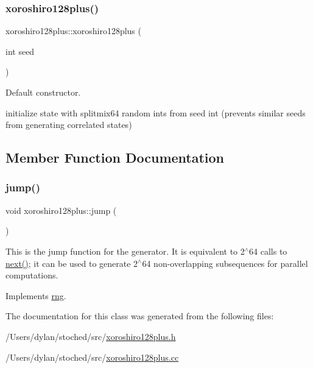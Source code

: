 \subsubsection{\texorpdfstring{xoroshiro128plus()}{xoroshiro128plus()}}
{\footnotesize\ttfamily xoroshiro128plus\+::xoroshiro128plus (\begin{DoxyParamCaption}\item[{int}]{seed }\end{DoxyParamCaption})}



Default constructor. 

initialize state with splitmix64 random ints from seed int (prevents similar seeds from generating correlated states) 

\subsection{Member Function Documentation}
\mbox{\label{classxoroshiro128plus_a8058dee37dfc67409ed8674ba8f830a9}} 
\subsubsection{\texorpdfstring{jump()}{jump()}}
{\footnotesize\ttfamily void xoroshiro128plus\+::jump (\begin{DoxyParamCaption}{ }\end{DoxyParamCaption})\hspace{0.3cm}{\ttfamily [virtual]}}

This is the jump function for the generator. It is equivalent to 2$^\wedge$64 calls to \hyperlink{classxoroshiro128plus_a14185bcb657d561663803f4a8b2e9a92}{next()}; it can be used to generate 2$^\wedge$64 non-\/overlapping subsequences for parallel computations. 

Implements \hyperlink{classrng_a2203fb1d2504c000306be5a0035d1a6c}{rng}.



The documentation for this class was generated from the following files\+:\begin{DoxyCompactItemize}
\item 
/\+Users/dylan/stoched/src/\hyperlink{xoroshiro128plus_8h}{xoroshiro128plus.\+h}\item 
/\+Users/dylan/stoched/src/\hyperlink{xoroshiro128plus_8cc}{xoroshiro128plus.\+cc}\end{DoxyCompactItemize}
